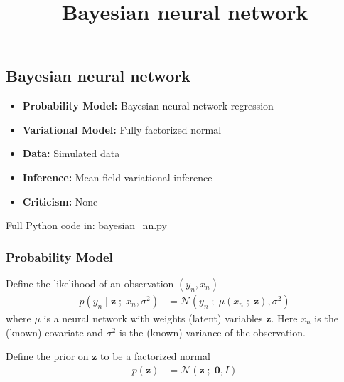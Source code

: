 \title{Bayesian neural network}

\subsection{Bayesian neural network}

\begin{itemize}
  \item \textbf{Probability Model:} Bayesian neural network regression
  \item \textbf{Variational Model:} Fully factorized normal 
  \item \textbf{Data:} Simulated data
  \item \textbf{Inference:} Mean-field variational inference
  \item \textbf{Criticism:} None
\end{itemize}

Full Python code in: 
\href{https://github.com/blei-lab/edward/blob/master/examples/bayesian_nn.py}
{bayesian_nn.py}


\subsubsection{Probability Model}
Define the likelihood of an observation $(y_n, x_n)$
\begin{align*}
  p(y_n \mid \mathbf{z} \;;\; x_n, \sigma^2)
  &=
  \mathcal{N}(y_n \;;\; \mu(x_n\;;\;\mathbf{z}), \sigma^2)
\end{align*} 
where $\mu$ is a neural network with weights (latent) variables 
$\mathbf{z}$. Here $x_n$ is the (known) covariate and $\sigma^2$ is the
(known) variance of the observation.

Define the prior on $\mathbf{z}$ to be a factorized normal
\begin{align*}
  p(\mathbf{z})
  &=
  \mathcal{N}(\mathbf{z} \;;\; \mathbf{0}, I)
\end{align*} 

